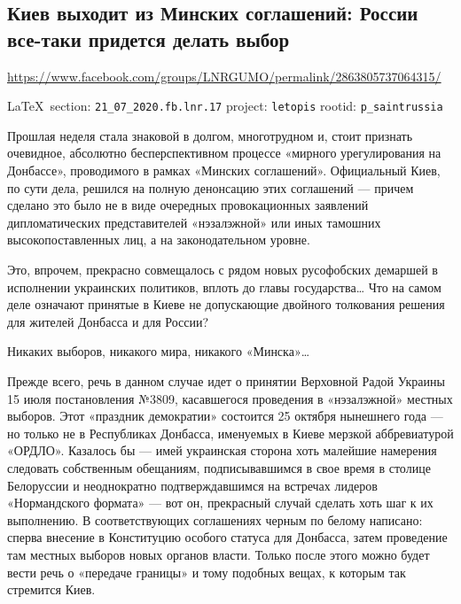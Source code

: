  
 
\subsection{Киев выходит из Минских соглашений: России все-таки придется делать выбор}
\url{https://www.facebook.com/groups/LNRGUMO/permalink/2863805737064315/}
  
\vspace{0.5cm}
{\small\LaTeX~section: \verb|21_07_2020.fb.lnr.17| project: \verb|letopis| rootid: \verb|p_saintrussia|}
\vspace{0.5cm}


Прошлая неделя стала знаковой в долгом, многотрудном и, стоит признать
очевидное, абсолютно бесперспективном процессе «мирного урегулирования на
Донбассе», проводимого в рамках «Минских соглашений». Официальный Киев, по сути
дела, решился на полную денонсацию этих соглашений --- причем сделано это было не
в виде очередных провокационных заявлений дипломатических представителей
«нэзалэжной» или иных тамошних высокопоставленных лиц, а на законодательном
уровне.

Это, впрочем, прекрасно совмещалось с рядом новых русофобских демаршей в
исполнении украинских политиков, вплоть до главы государства… Что на самом деле
означают принятые в Киеве не допускающие двойного толкования решения для
жителей Донбасса и для России?

Никаких выборов, никакого мира, никакого «Минска»…

Прежде всего, речь в данном случае идет о принятии Верховной Радой Украины 15
июля постановления №3809, касавшегося проведения в «нэзалэжной» местных
выборов. Этот «праздник демократии» состоится 25 октября нынешнего года --- но
только не в Республиках Донбасса, именуемых в Киеве мерзкой аббревиатурой
«ОРДЛО». Казалось бы --- имей украинская сторона хоть малейшие намерения
следовать собственным обещаниям, подписывавшимся в свое время в столице
Белоруссии и неоднократно подтверждавшимся на встречах лидеров «Нормандского
формата» --- вот он, прекрасный случай сделать хоть шаг к их выполнению. В
соответствующих соглашениях черным по белому написано: сперва внесение в
Конституцию особого статуса для Донбасса, затем проведение там местных выборов
новых органов власти. Только после этого можно будет вести речь о «передаче
границы» и тому подобных вещах, к которым так стремится Киев.

